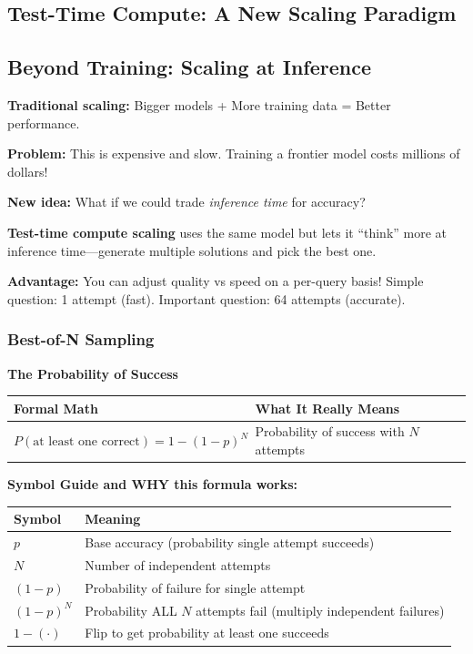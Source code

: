\begin{chapterenv}

\chapter{Test-Time Compute: A New Scaling Paradigm}

\section{Beyond Training: Scaling at Inference}

\textbf{Traditional scaling:} Bigger models + More training data = Better performance.

\textbf{Problem:} This is expensive and slow. Training a frontier model costs millions of dollars!

\textbf{New idea:} What if we could trade \textit{inference time} for accuracy?

\textbf{Test-time compute scaling} uses the same model but lets it ``think'' more at inference time---generate multiple solutions and pick the best one.

\textbf{Advantage:} You can adjust quality vs speed on a per-query basis! Simple question: 1 attempt (fast). Important question: 64 attempts (accurate).

\subsection{Best-of-N Sampling}

\begin{infobox}
\textbf{The Probability of Success}

\begin{center}
\begin{tabular}{p{}p{}}
\toprule
\textbf{Formal Math} & \textbf{What It Really Means} \\
\midrule
$P(\text{at least one correct}) = 1 - (1-p)^N$ & Probability of success with $N$ attempts \\
\bottomrule
\end{tabular}
\end{center}

\textbf{Symbol Guide and WHY this formula works:}

\begin{center}
\begin{tabular}{p{}p{}}
\toprule
\textbf{Symbol} & \textbf{Meaning} \\
\midrule
$p$ & Base accuracy (probability single attempt succeeds) \\
$N$ & Number of independent attempts \\
$(1-p)$ & Probability of failure for single attempt \\
$(1-p)^N$ & Probability ALL $N$ attempts fail (multiply independent failures) \\
$1 - (\cdot)$ & Flip to get probability at least one succeeds \\
\bottomrule
\end{tabular}
\end{center}


\end{infobox}
\end{chapterenv}
